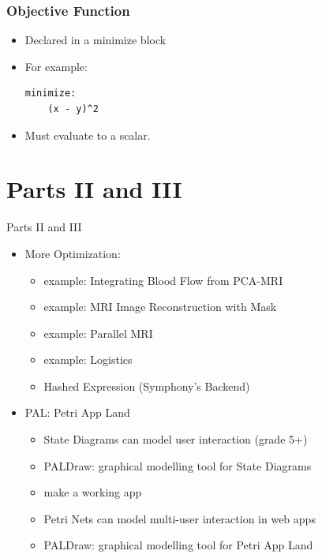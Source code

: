 \documentclass[presentation]{beamer}
\begin{document}
\begin{frame}[fragile]
  \frametitle{Objective Function}

  \begin{itemize}
  \item Declared in a {\color{red} minimize} block
  \item For example:
  \begin{lstlisting}[style=Haskell]
  minimize:
    (x - y)^2
  \end{lstlisting}
  \item Must evaluate to a scalar.
  \end{itemize}
\end{frame}

\section{Parts II and III}

\begin{frame}{Parts II and III}
  \begin{itemize}
  \item More Optimization: 
  \begin{itemize}
  \item example: Integrating Blood Flow from PCA-MRI
  \item example: MRI Image Reconstruction with Mask
  \item example: Parallel MRI
  \item example: Logistics
  \item Hashed Expression (Symphony's Backend)
  \end{itemize}
  \item PAL:  Petri App Land
  \begin{itemize}
  \item State Diagrams can model user interaction (grade 5+)
  \item PALDraw:  graphical modelling tool for State Diagrams
  \item make a working app
  \item Petri Nets can model multi-user interaction in web apps
  \item PALDraw:  graphical modelling tool for Petri App Land
  \end{itemize}
  \end{itemize}
\end{frame}
\end{document}

